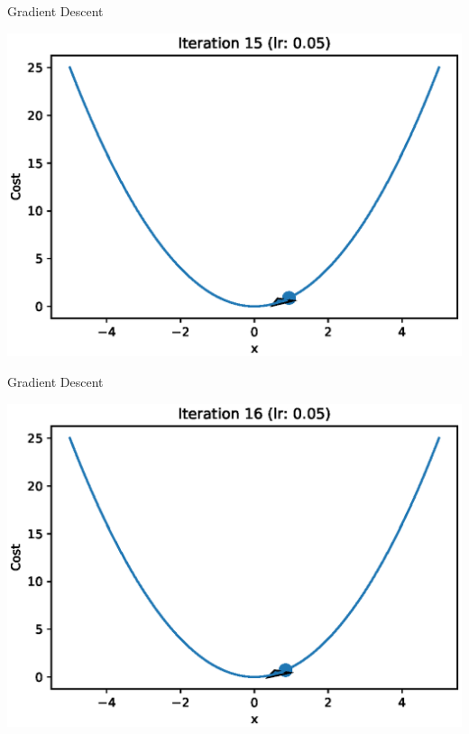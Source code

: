 \documentclass{beamer}
\begin{document}
	\begin{frame}{Gradient Descent}
		\begin{center}
			\includegraphics[totalheight=6cm]{gradient-descent/iteration-15.eps}
		\end{center}
	\end{frame}
	
	\begin{frame}{Gradient Descent}
		\begin{center}
			\includegraphics[totalheight=6cm]{gradient-descent/iteration-16.eps}
		\end{center}
	\end{frame}
	
\end{document}
